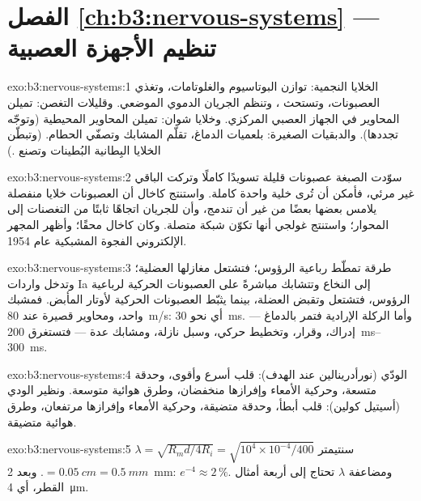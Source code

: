 \section*{الفصل \ref{ch:b3:nervous-systems} --- تنظيم الأجهزة العصبية}

\begin{solution}{exo:b3:nervous-systems:1}
الخلايا النجمية: توازن البوتاسيوم والغلوتامات، وتغذي
العصبونات، وتستحث ، وتنظم الجريان
الدموي الموضعي. وقليلات التغصن: تميلن المحاوير في الجهاز
العصبي المركزي. وخلايا شوان: تميلن المحاوير المحيطية (وتوجّه
تجددها). والدبقيات الصغيرة: بلعميات الدماغ، تقلّم المشابك
وتصفّي الحطام. (وتبطّن الخلايا البِطانية البُطينات وتصنع
.)
\end{solution}

\begin{solution}{exo:b3:nervous-systems:2}
سوّدت الصبغة عصبونات قليلة تسويدًا كاملًا وتركت الباقي غير
مرئي، فأمكن أن تُرى خلية واحدة كاملة. واستنتج كاخال أن
العصبونات خلايا منفصلة يلامس بعضها بعضًا من غير أن تندمج،
وأن للجريان اتجاهًا ثابتًا من التغصنات إلى المحوار؛ واستنتج
غولجي أنها تكوّن شبكة متصلة. وكان كاخال محقًا؛ وأظهر المجهر
الإلكتروني الفجوة المشبكية عام 1954.
\end{solution}

\begin{solution}{exo:b3:nervous-systems:3}
طرقة تمطّط رباعية الرؤوس؛ فتشتعل مغازلها العضلية؛ وتدخل
واردات Ia إلى النخاع وتتشابك مباشرةً على العصبونات الحركية
لرباعية الرؤوس، فتشتعل وتقبض العضلة، بينما يثبّط 
العصبونات الحركية لأوتار المأبض. فمشبك واحد، ومحاوير قصيرة
عند \qty{80}{m/s}: أي نحو \qty{30}{ms}. وأما الركلة الإرادية
فتمر بالدماغ --- إدراك، وقرار، وتخطيط حركي، وسبل نازلة،
ومشابك عدة --- فتستغرق \qtyrange{200}{300}{ms}.
\end{solution}

\begin{solution}{exo:b3:nervous-systems:4}
الودّي (نورأدرينالين عند الهدف): قلب أسرع وأقوى، وحدقة
متسعة، وحركية الأمعاء وإفرازها منخفضان، وطرق هوائية متوسعة.
ونظير الودي (أسيتيل كولين): قلب أبطأ، وحدقة متضيقة، وحركية
الأمعاء وإفرازها مرتفعان، وطرق هوائية متضيقة.
\end{solution}

\begin{solution}{exo:b3:nervous-systems:5}
$\lambda = \sqrt{R_{m}d/4R_{i}} = \sqrt{10^{4}\times 10^{-4}/400}$ سنتيمتر
$= \qty{0.05}{cm} = \qty{0.5}{mm}$. وبعد \qty{2}{mm}: $e^{-4} \approx
2\,\%$. ومضاعفة $\lambda$ تحتاج إلى أربعة أمثال القطر، أي
\qty{4}{\micro m}.
\end{solution}

